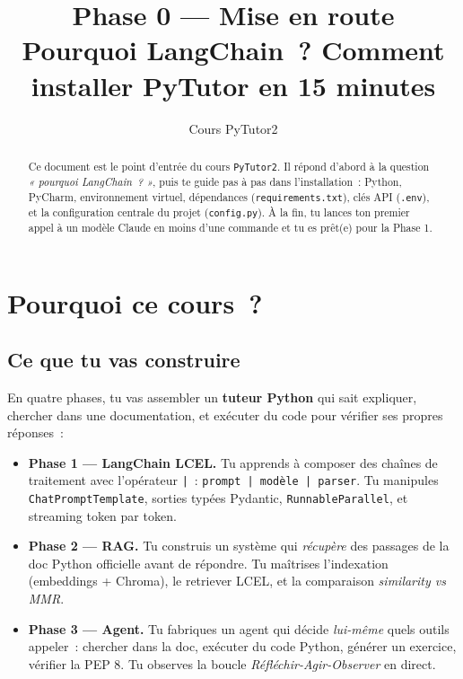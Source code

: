 \documentclass[11pt,a4paper]{article}
\title{\textbf{Phase 0 — Mise en route}\\
\large Pourquoi LangChain~? Comment installer PyTutor en 15 minutes}
\author{Cours PyTutor2}
\date{}
\begin{document}
\maketitle

\begin{abstract}
\noindent
Ce document est le point d'entrée du cours \texttt{PyTutor2}. Il
répond d'abord à la question \emph{« pourquoi LangChain~? »}, puis
te guide pas à pas dans l'installation~: Python, PyCharm,
environnement virtuel, dépendances (\texttt{requirements.txt}), clés
API (\texttt{.env}), et la configuration centrale du projet
(\texttt{config.py}). À la fin, tu lances ton premier appel à un
modèle Claude en moins d'une commande et tu es prêt(e) pour la
Phase 1.
\end{abstract}

\tableofcontents
\bigskip

\section{Pourquoi ce cours~?}

\subsection{Ce que tu vas construire}

En quatre phases, tu vas assembler un \textbf{tuteur Python} qui sait
expliquer, chercher dans une documentation, et exécuter du code pour
vérifier ses propres réponses~:

\begin{itemize}[leftmargin=*]
  \item \textbf{Phase 1 — LangChain LCEL.} Tu apprends à composer des
        chaînes de traitement avec l'opérateur \texttt{|}~:
        \texttt{prompt | modèle | parser}. Tu manipules
        \texttt{ChatPromptTemplate}, sorties typées Pydantic,
        \texttt{RunnableParallel}, et streaming token par token.
  \item \textbf{Phase 2 — RAG.} Tu construis un système qui
        \emph{récupère} des passages de la doc Python officielle
        avant de répondre. Tu maîtrises l'indexation (embeddings +
        Chroma), le retriever LCEL, et la comparaison
        \emph{similarity vs MMR}.
  \item \textbf{Phase 3 — Agent.} Tu fabriques un agent qui décide
        \emph{lui-même} quels outils appeler~: chercher dans la doc,
        exécuter du code Python, générer un exercice, vérifier la
        PEP 8. Tu observes la boucle \emph{Réfléchir-Agir-Observer}
        en direct.
\end{itemize}
\end{document}
